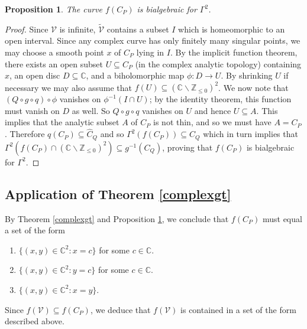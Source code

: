 \documentclass[11pt,reqno]{amsart}
\newtheorem{proposition}[theorem]{Proposition}
\theoremstyle{definition}
\numberwithin{equation}{section}
\renewcommand{\tilde}{\widetilde}
\newcommand{\cV}{\mathcal{V}}
\begin{document}
\begin{proposition} \label{lem:realcompbalg}
The curve $f(C_P)$ is bialgebraic for $\Gamma^2$.
\end{proposition}
\begin{proof}
 Since $\mathcal V$ is infinite, $\tilde{\cV}$ contains a subset $I$ which is homeomorphic to an open interval.  Since any complex curve has only finitely many singular points, we may choose a smooth point $x$ of $C_P$ lying in $I$.  By the implicit function theorem, there exists an open subset $U \subseteq C_P$ (in the complex analytic topology) containing $x$, an open disc $D \subseteq \mathbb C$,  and a biholomorphic map $\phi: D \rightarrow U$.  By shrinking $U$ if necessary we  may also assume that  $f(U) \subseteq (\mathbb C  \smallsetminus \mathbb Z_{\leq 0})^{2}$. We now note that $(Q \circ g \circ q) \circ \phi$ vanishes on $\phi^{-1}(I \cap U)$; by the identity theorem, this function must vanish on $D$ as well.  So $Q \circ g \circ q$ vanishes on $U$ and hence $U \subseteq A$. 
This implies that the analytic subset $A$ of $C_P$ is not thin,  
and so we must have $A=C_P$. Therefore $q(C_P)\subseteq \hat{C}_Q$ and so $\Gamma^2(f(C_P)) \subseteq \hat{C}_Q $ which in turn implies that $\Gamma^2(f(C_P) \cap (\mathbb C  \smallsetminus \mathbb Z_{\leq 0})^{2} ) \subseteq g^{-1}(C_Q)$, proving that  $f(C_P)$ is bialgebraic for $\Gamma^2$. 
\end{proof}


\subsection{Application of Theorem \ref{complexgt}}

By Theorem \ref{complexgt} and Proposition \ref{lem:realcompbalg}, we conclude that $f(C_P)$ must equal a set of the form 
\begin{enumerate}
\item $\{(x, y) \in \mathbb C^2: x=c\}$ for some $c \in \mathbb C$.  

\item  $\{(x, y) \in \mathbb C^2: y=c\}$ for some $c \in \mathbb C$.  

\item  $\{(x, y) \in \mathbb C^2: x=y\}$. 
\end{enumerate}

Since $f(\mathcal V) \subseteq f(C_P)$, we deduce that $f(\mathcal V)$ is contained in a set of the form described above. 
\end{document}
